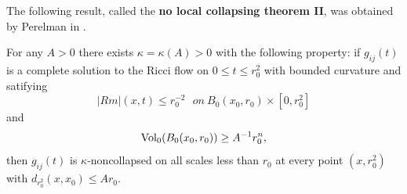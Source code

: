 The following result, called the {\bf no local collapsing theorem
II}, was obtained by
Perelman in \cite{P1}.


\begin{theorem}
  \label{thm:cz-no-local-collapsing-for-complete-flows}
For any $A >0$ there exists $\kappa=\kappa(A)>0$ with the
following property: if $g_{ij}(t)$ is a complete solution to the
Ricci flow on $0\leq t\leq r_0^2$ with bounded curvature and
satifying
$$
|Rm|(x,t)\leq r_0^{-2}\ \ \ on \ B_0(x_0,r_0)\times [0,r_0^2]
$$
and
$$
\operatorname{Vol}_0(B_0(x_0,r_0))\geq A^{-1}r_0^n,
$$
then $g_{ij}(t)$ is $\kappa$-noncollapsed on all scales less than
$r_0$ at every point $(x,r_0^2)$ with $d_{r_0^2}(x,x_0)\leq Ar_0$.
\end{theorem}

